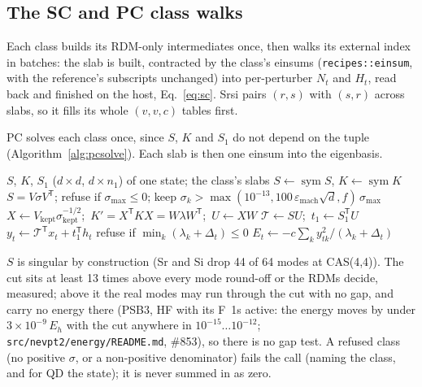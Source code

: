 \documentclass[11pt]{article}
\newcommand{\code}[1]{\texttt{#1}}
\newcommand{\T}{\mathsf T}
\newcommand{\sym}{\operatorname{sym}}
\newcommand{\Tc}{\mathcal T}
\begin{document}
\subsection{The SC and PC class walks}
\label{sec:pc-alg}

Each class builds its RDM-only intermediates once, then walks its external
index in batches: the slab is built, contracted by the class's einsums
(\code{recipes::einsum}, with the reference's subscripts unchanged) into per-perturber
$N_t$ and $H_t$, read back and finished on the host, Eq.~\eqref{eq:sc}. Srsi
pairs $(r,s)$ with $(s,r)$ across slabs, so it fills its whole $(v,v,c)$
tables first.

PC solves each class once, since $S$, $K$ and $S_1$ do not depend on the
tuple (Algorithm~\ref{alg:pcsolve}). Each slab is then one einsum into the
eigenbasis.

\begin{algorithm}[htbp]
\caption{A PC class (\code{solve\_class}, then the walk)}
\label{alg:pcsolve}
\begin{algorithmic}[1]
\Require $S$, $K$, $S_1$ ($d\times d$, $d\times n_1$) of one state; the class's slabs
\State $S \gets \sym S$, $K \gets \sym K$ 
\State $S = V\sigma V^\T$; refuse if $\sigma_{\max} \le 0$; keep $\sigma_k > \max(10^{-13}, 100\,\varepsilon_{\mathrm{mach}}\sqrt d, f)\,\sigma_{\max}$ 
\State $X \gets V_{\mathrm{kept}}\sigma_{\mathrm{kept}}^{-1/2}$;\ $K' = X^\T K X = W\lambda W^\T$;\ $U \gets XW$
\State $\Tc \gets SU$;\ $t_1 \gets S_1^\T U$
  \State $y_t \gets \Tc^\T x_t + t_1^\T h_t$ 
  \State refuse if $\min_k(\lambda_k + \Delta_t) \le 0$
  \State $E_t \gets -c\sum_k y_{tk}^2/(\lambda_k + \Delta_t)$
\EndFor
\end{algorithmic}
\end{algorithm}

$S$ is singular by construction (Sr and Si drop 44 of 64 modes at CAS(4,4)).
The cut sits at least 13 times above every mode round-off or the RDMs
decide, measured; above it the real modes may run through the cut with no
gap, and carry no energy there (PSB3, HF with its F~1s active: the energy
moves by under $3\times10^{-9}\,E_h$ with the cut anywhere in
$10^{-15}\ldots10^{-12}$; \code{src/nevpt2/energy/README.md}, \#853), so
there is no gap test. A refused class (no positive $\sigma$, or a
non-positive denominator) fails the call (naming the class,
and for QD the state); it is never summed in as zero.
\end{document}
